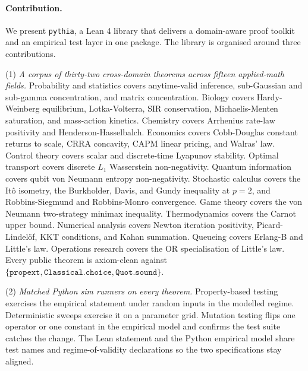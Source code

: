 \paragraph{Contribution.}
We present \texttt{pythia}, a Lean 4 library that delivers a
domain-aware proof toolkit and an empirical test layer in one
package. The library is organised around three contributions.

(1) \emph{A corpus of thirty-two cross-domain theorems across
fifteen applied-math fields.} Probability and statistics covers
anytime-valid inference, sub-Gaussian and sub-gamma
concentration, and matrix concentration. Biology covers
Hardy-Weinberg equilibrium, Lotka-Volterra, SIR conservation,
Michaelis-Menten saturation, and mass-action kinetics. Chemistry
covers Arrhenius rate-law positivity and Henderson-Hasselbalch.
Economics covers Cobb-Douglas constant returns to scale, CRRA
concavity, CAPM linear pricing, and Walras' law. Control theory
covers scalar and discrete-time Lyapunov stability. Optimal
transport covers discrete $L_1$ Wasserstein non-negativity.
Quantum information covers qubit von Neumann entropy
non-negativity. Stochastic calculus covers the It\^o isometry,
the Burkholder, Davis, and Gundy inequality at $p{=}2$, and
Robbins-Siegmund and Robbins-Monro convergence. Game theory
covers the von Neumann two-strategy minimax inequality.
Thermodynamics covers the Carnot upper bound. Numerical
analysis covers Newton iteration positivity,
Picard-Lindel\"of, KKT conditions, and Kahan summation. Queueing
covers Erlang-B and Little's law. Operations research covers
the OR specialisation of Little's law. Every public theorem is
axiom-clean against
$\{\texttt{propext}, \texttt{Classical.choice}, \texttt{Quot.sound}\}$.

(2) \emph{Matched Python sim runners on every theorem.}
Property-based testing exercises the empirical statement under
random inputs in the modelled regime. Deterministic sweeps
exercise it on a parameter grid. Mutation testing flips one
operator or one constant in the empirical model and confirms the
test suite catches the change. The Lean statement and the Python
empirical model share test names and regime-of-validity
declarations so the two specifications stay aligned.

